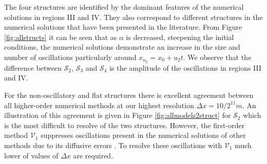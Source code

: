 \documentclass[times]{elsarticle}
\begin{document}
The four structures are identified by the dominant features of the numerical solutions in regions III and IV. They also correspond to different structures in the numerical solutions that have been presented in the literature. From Figure \ref{fig:allstructs} it can be seen that as $\alpha$ is decreased, steepening the initial conditions, the numerical solutions demonstrate an increase in the size and number of oscillations particularly around $x_{u_2} = x_0 + u_2 t$. We observe that the difference between $\mathcal{S}_2$, $\mathcal{S}_3$ and $\mathcal{S}_4$ is the amplitude of the oscillations in regions III and IV.

For the non-oscillatory and flat structures there is excellent agreement between all higher-order numerical methods at our highest resolution $\Delta x = 10/2^{11}m$. An illustration of this agreement is given in Figure \ref{fig:allmodels2struct} for $\mathcal{S}_2$ which is the most difficult to resolve of the two structures. However, the first-order method $\mathcal{V}_1$ suppresses oscillations present in the numerical solutions of other methods due to its diffusive errors \cite{Zoppou-etal-2017}. To resolve these oscillations with $\mathcal{V}_1$ much lower of values of $\Delta x$ are required.
\end{document}
